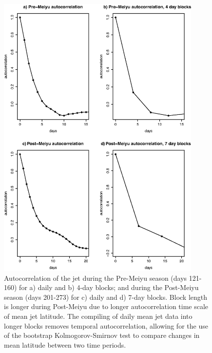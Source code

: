 \documentclass[final,grl]{agutexSI}
\begin{document}
\begin{figure}
\centering

\noindent\includegraphics[width=24pc]{Figures/S5}
\caption{Autocorrelation of the jet during the Pre-Meiyu season (days 121-160) for a) daily and b) 4-day blocks; and during the Post-Meiyu season (days 201-273) for c) daily and d) 7-day blocks. Block length is longer during Post-Meiyu due to longer autocorrelation time scale of mean jet latitude. The compiling of daily mean jet data into longer blocks removes temporal autocorrelation, allowing for the use of the bootstrap Kolmogorov-Smirnov test to compare changes in mean latitude between two time periods.}
\end{figure}
\end{document}
